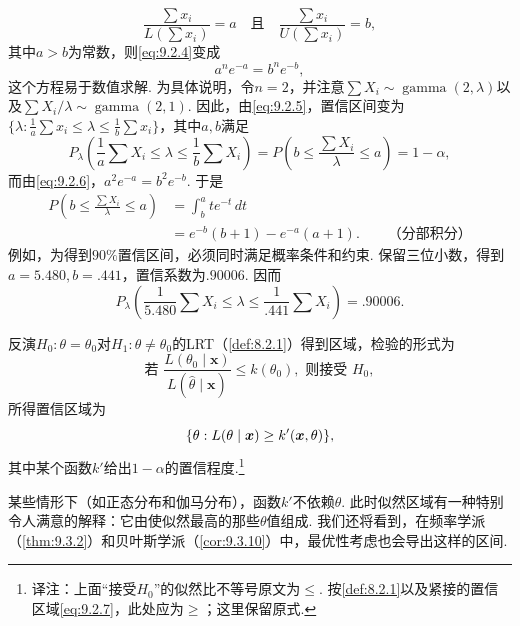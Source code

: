 \begin{example}[反演似然比检验]
\begin{equation}
\frac{\sum x_i}{L(\sum x_i)}=a\quad\text{且}\quad\frac{\sum x_i}{U(\sum x_i)}=b,
\end{equation}
其中$a>b$为常数，则\eqref{eq:9.2.4}变成
\begin{equation}\label{eq:9.2.6}a^ne^{-a}=b^ne^{-b},\end{equation}
这个方程易于数值求解. 为具体说明，令$n=2$，并注意$\sum X_i\sim\operatorname{gamma}(2,\lambda)$以及$\sum X_i/\lambda\sim\operatorname{gamma}(2,1)$. 因此，由\eqref{eq:9.2.5}，置信区间变为$\{\lambda:\frac1a\sum x_i\le\lambda\le\frac1b\sum x_i\}$，其中$a,b$满足
$$P_\lambda\left(\frac1a\sum X_i\le\lambda\le\frac1b\sum X_i\right)=P\left(b\le\frac{\sum X_i}\lambda\le a\right)=1-\alpha,$$
而由\eqref{eq:9.2.6}，$a^2e^{-a}=b^2e^{-b}$. 于是
$$\begin{aligned}
P\left(b\le\frac{\sum X_i}\lambda\le a\right)&=\int_b^a te^{-t}\,dt\\
&=e^{-b}(b+1)-e^{-a}(a+1).\qquad\text{（分部积分）}
\end{aligned}$$
例如，为得到$90\%$置信区间，必须同时满足概率条件和约束. 保留三位小数，得到$a=5.480,b=.441$，置信系数为$.90006$. 因而
$$P_\lambda\left(\frac1{5.480}\sum X_i\le\lambda\le\frac1{.441}\sum X_i\right)=.90006.$$
\end{example}
反演$H_0:\theta=\theta_0$对$H_1:\theta\ne\theta_0$的LRT（\autoref{def:8.2.1}）得到区域，检验的形式为
$$\text{若 }\frac{L(\theta_0\mid\boldsymbol x)}{L(\hat\theta\mid\boldsymbol x)}\le k(\theta_0),\text{ 则接受 }H_0,$$
所得置信区域为
\begin{equation}\label{eq:9.2.7}\index{SI0156@似然}
\{\theta:L(\theta\mid\boldsymbol x)\ge k'(\boldsymbol x,\theta)\},
\end{equation}
其中某个函数$k'$给出$1-\alpha$的置信程度.\footnote{译注：上面“接受$H_0$”的似然比不等号原文为$\le$. 按\autoref{def:8.2.1}以及紧接的置信区域\eqref{eq:9.2.7}，此处应为$\ge$；这里保留原式.}

某些情形下（如正态分布和伽马分布），函数$k'$不依赖$\theta$. 此时似然区域有一种特别令人满意的解释：它由使似然最高的那些$\theta$值组成. 我们还将看到，在频率学派（\autoref{thm:9.3.2}）和贝叶斯学派（\autoref{cor:9.3.10}）中，最优性考虑也会导出这样的区间.

